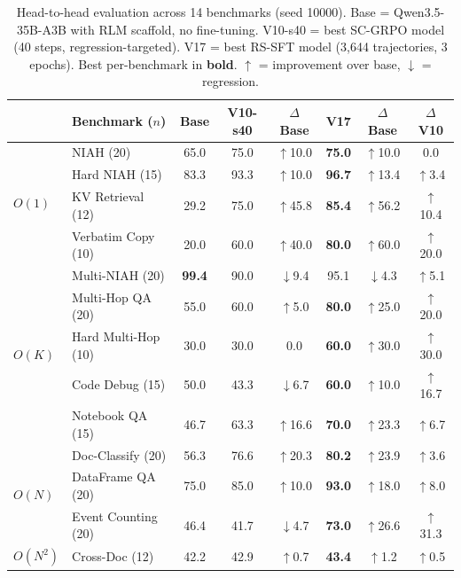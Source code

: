 \documentclass{article}
\begin{document}
\begin{table}[t]
\caption{Head-to-head evaluation across 14 benchmarks (seed 10000). Base = Qwen3.5-35B-A3B with RLM scaffold, no fine-tuning. V10-s40 = best SC-GRPO model (40 steps, regression-targeted). V17 = best RS-SFT model (3,644 trajectories, 3 epochs). Best per-benchmark in \textbf{bold}. $\uparrow$ = improvement over base, $\downarrow$ = regression.}
\label{tab:main}
\vskip 0.15in
\begin{center}
\begin{small}
\begin{tabular}{llcccccc}
\toprule
& Benchmark ($n$) & Base & V10-s40 & $\Delta$ Base & \textbf{V17} & $\Delta$ Base & $\Delta$ V10 \\
\midrule
\multirow{4}{*}{$O(1)$}
& NIAH (20) & 65.0 & 75.0 & $\uparrow$10.0 & \textbf{75.0} & $\uparrow$10.0 & 0.0 \\
& Hard NIAH (15) & 83.3 & 93.3 & $\uparrow$10.0 & \textbf{96.7} & $\uparrow$13.4 & $\uparrow$3.4 \\
& KV Retrieval (12) & 29.2 & 75.0 & $\uparrow$45.8 & \textbf{85.4} & $\uparrow$56.2 & $\uparrow$10.4 \\
& Verbatim Copy (10) & 20.0 & 60.0 & $\uparrow$40.0 & \textbf{80.0} & $\uparrow$60.0 & $\uparrow$20.0 \\
\midrule
\multirow{5}{*}{$O(K)$}
& Multi-NIAH (20) & \textbf{99.4} & 90.0 & $\downarrow$9.4 & 95.1 & $\downarrow$4.3 & $\uparrow$5.1 \\
& Multi-Hop QA (20) & 55.0 & 60.0 & $\uparrow$5.0 & \textbf{80.0} & $\uparrow$25.0 & $\uparrow$20.0 \\
& Hard Multi-Hop (10) & 30.0 & 30.0 & 0.0 & \textbf{60.0} & $\uparrow$30.0 & $\uparrow$30.0 \\
& Code Debug (15) & 50.0 & 43.3 & $\downarrow$6.7 & \textbf{60.0} & $\uparrow$10.0 & $\uparrow$16.7 \\
& Notebook QA (15) & 46.7 & 63.3 & $\uparrow$16.6 & \textbf{70.0} & $\uparrow$23.3 & $\uparrow$6.7 \\
\midrule
\multirow{3}{*}{$O(N)$}
& Doc-Classify (20) & 56.3 & 76.6 & $\uparrow$20.3 & \textbf{80.2} & $\uparrow$23.9 & $\uparrow$3.6 \\
& DataFrame QA (20) & 75.0 & 85.0 & $\uparrow$10.0 & \textbf{93.0} & $\uparrow$18.0 & $\uparrow$8.0 \\
& Event Counting (20) & 46.4 & 41.7 & $\downarrow$4.7 & \textbf{73.0} & $\uparrow$26.6 & $\uparrow$31.3 \\
\midrule
$O(N^2)$ & Cross-Doc (12) & 42.2 & 42.9 & $\uparrow$0.7 & \textbf{43.4} & $\uparrow$1.2 & $\uparrow$0.5 \\

\end{tabular}
\end{small}
\end{center}
\end{table}
\end{document}
